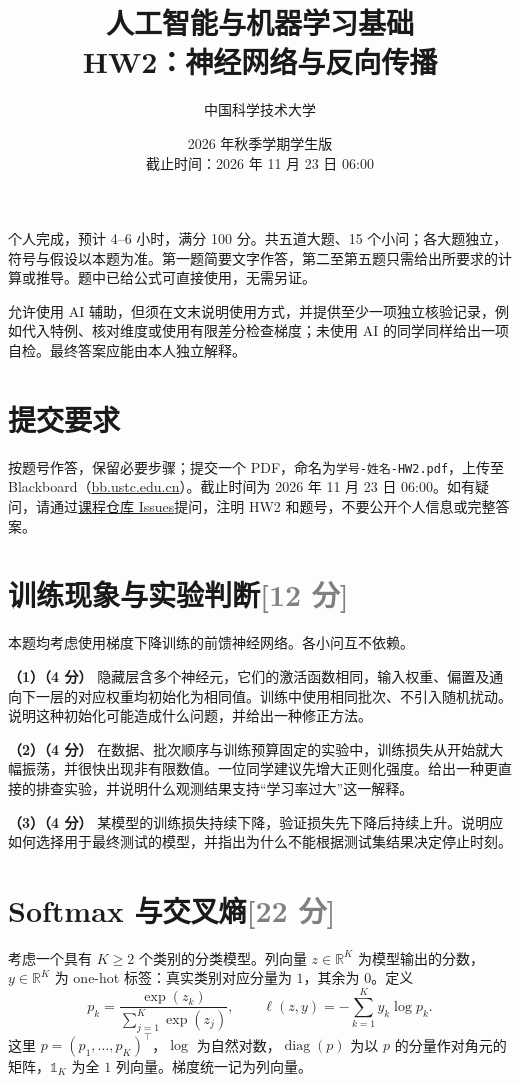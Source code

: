 \documentclass[11pt,a4paper]{article}
\title{\vspace{-1cm}\textbf{人工智能与机器学习基础\\HW2：神经网络与反向传播}}
\author{中国科学技术大学}
\date{2026 年秋季学期\quad 学生版\\[0.3em]截止时间：2026 年 11 月 23 日 06:00}
\newcommand{\R}{\mathbb R}
\newcommand{\diag}{\operatorname{diag}}
\newcommand{\partq}[2]{\par\Needspace{5\baselineskip}\noindent\textbf{（#1）（#2 分）}}
\begin{document}
\maketitle\thispagestyle{fancy}
个人完成，预计 4--6 小时，满分 100 分。共五道大题、15 个小问；各大题独立，符号与假设以本题为准。第一题简要文字作答，第二至第五题只需给出所要求的计算或推导。题中已给公式可直接使用，无需另证。

允许使用 AI 辅助，但须在文末说明使用方式，并提供至少一项独立核验记录，例如代入特例、核对维度或使用有限差分检查梯度；未使用 AI 的同学同样给出一项自检。最终答案应能由本人独立解释。

\section*{提交要求}
按题号作答，保留必要步骤；提交一个 PDF，命名为\texttt{学号-姓名-HW2.pdf}，上传至 Blackboard（\href{https://bb.ustc.edu.cn}{bb.ustc.edu.cn}）。截止时间为 2026 年 11 月 23 日 06:00。如有疑问，请通过\href{https://github.com/Intelligent114/ALML_public/issues}{课程仓库 Issues}提问，注明 HW2 和题号，不要公开个人信息或完整答案。
\section[训练现象与实验判断]{训练现象与实验判断\hfill\textcolor{gray}{[12 分]}}

本题均考虑使用梯度下降训练的前馈神经网络。各小问互不依赖。

\partq{1}{4} 隐藏层含多个神经元，它们的激活函数相同，输入权重、偏置及通向下一层的对应权重均初始化为相同值。训练中使用相同批次、不引入随机扰动。说明这种初始化可能造成什么问题，并给出一种修正方法。

\partq{2}{4} 在数据、批次顺序与训练预算固定的实验中，训练损失从开始就大幅振荡，并很快出现非有限数值。一位同学建议先增大正则化强度。给出一种更直接的排查实验，并说明什么观测结果支持“学习率过大”这一解释。

\partq{3}{4} 某模型的训练损失持续下降，验证损失先下降后持续上升。说明应如何选择用于最终测试的模型，并指出为什么不能根据测试集结果决定停止时刻。

\clearpage
\section[Softmax 与交叉熵]{Softmax 与交叉熵\hfill\textcolor{gray}{[22 分]}}

考虑一个具有 $K\geq2$ 个类别的分类模型。列向量 $z\in\R^K$ 为模型输出的分数，$y\in\R^K$ 为 one-hot 标签：真实类别对应分量为 $1$，其余为 $0$。定义
\[
p_k=\frac{\exp(z_k)}{\sum_{j=1}^K\exp(z_j)},\qquad
\ell(z,y)=-\sum_{k=1}^K y_k\log p_k.
\]
这里 $p=(p_1,\ldots,p_K)^\top$，$\log$ 为自然对数，$\diag(p)$ 为以 $p$ 的分量作对角元的矩阵，$\mathds{1}_K$ 为全 $1$ 列向量。梯度统一记为列向量。
\end{document}
